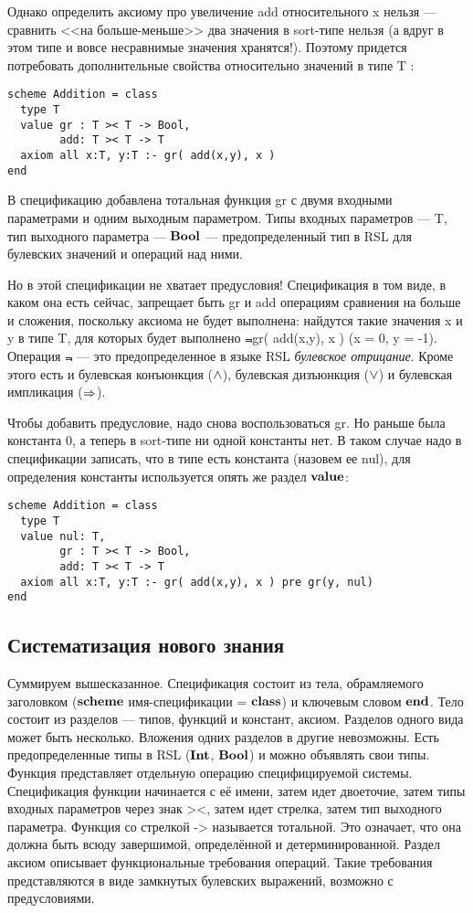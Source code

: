 \documentclass[12pt]{extreport}
\begin{document}
Однако определить аксиому про увеличение add относительного x нельзя --- сравнить <<на больше-меньше>> два значения в sort-типе нельзя (а вдруг в этом типе и вовсе несравнимые значения хранятся!). Поэтому придется потребовать дополнительные свойства относительно значений в типе T :
\begin{lstlisting}
scheme Addition = class
  type T
  value gr : T >< T -> Bool,
        add: T >< T -> T
  axiom all x:T, y:T :- gr( add(x,y), x )
end
\end{lstlisting}

В спецификацию добавлена тотальная функция gr с двумя входными параметрами и одним выходным параметром. Типы входных параметров --- T, тип выходного параметра --- $\textbf{Bool}$ --- предопределенный тип в RSL для булевских значений и операций над ними.

Но в этой спецификации не хватает предусловия! Спецификация в том виде, в каком она есть сейчас, запрещает быть gr и add операциям сравнения на больше и сложения, поскольку аксиома не будет выполнена: найдутся такие значения x и y в типе T, для которых будет выполнено $\Not$gr( add(x,y), x ) (x = 0, y = -1). Операция $\Not$ --- это предопределенное в языке RSL \emph{булевское отрицание}. Кроме этого есть и булевская конъюнкция ($\wedge$), булевская дизъюнкция ($\vee$) и булевская импликация ($\mathop{\Rightarrow}$).

Чтобы добавить предусловие, надо снова воспользоваться gr. Но раньше была константа 0, а теперь в sort-типе ни одной константы нет. В таком случае надо в спецификации записать, что в типе есть константа (назовем ее nul), для определения константы используется опять же раздел $\textbf{value}$:
\begin{lstlisting}
scheme Addition = class
  type T
  value nul: T,
        gr : T >< T -> Bool,
        add: T >< T -> T
  axiom all x:T, y:T :- gr( add(x,y), x ) pre gr(y, nul)
end
\end{lstlisting}

\subsection*{Систематизация нового знания}
Суммируем вышесказанное. Спецификация состоит из тела, обрамляемого заголовком ($\mathop{\textbf{scheme}}$ имя-спецификации = $\mathop{\textbf{class}}$) и ключевым словом $\textbf{end}$. Тело состоит из разделов --- типов, функций и констант, аксиом. Разделов одного вида может быть несколько. Вложения одних разделов в другие невозможны. Есть предопределенные типы в RSL ($\textbf{Int}$, $\textbf{Bool}$) и можно объявлять свои типы. Функция представляет отдельную операцию специфицируемой системы. Спецификация функции начинается с её имени, затем идет двоеточие, затем типы входных параметров через знак ><, затем идет стрелка, затем тип выходного параметра. Функция со стрелкой -> называется тотальной. Это означает, что она должна быть всюду завершимой, определённой и детерминированной. Раздел аксиом описывает функциональные требования операций. Такие требования представляются в виде замкнутых булевских выражений, возможно с предусловиями.
\end{document}
